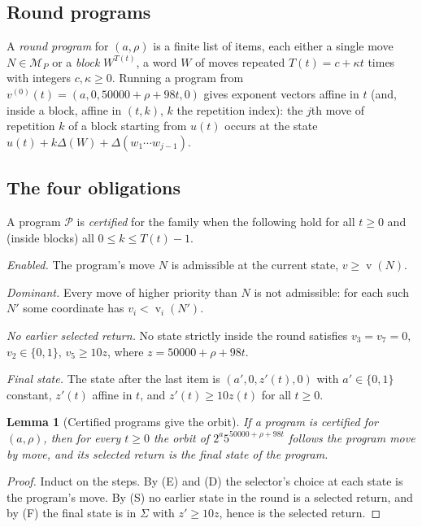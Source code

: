 \documentclass[11pt,a4paper]{article}
\newtheorem{lemma}[theorem]{Lemma}
\theoremstyle{definition}
\newcommand{\Sig}{\Sigma}
\DeclareMathOperator{\vp}{v}
\begin{document}
\subsection{Round programs}
A \emph{round program} for $(a,\rho)$ is a finite list of items, each either a single move $N\in\mathcal{M}_P$ or a \emph{block} $W^{T(t)}$, a word $W$ of moves repeated $T(t)=c+\kappa t$ times with integers $c,\kappa\ge0$. Running a program from $v^{(0)}(t)=(a,0,50000+\rho+98t,0)$ gives exponent vectors affine in $t$ (and, inside a block, affine in $(t,k)$, $k$ the repetition index): the $j$th move of repetition $k$ of a block starting from $u(t)$ occurs at the state $u(t)+k\Delta(W)+\Delta(w_1\cdots w_{j-1})$.

\subsection{The four obligations}
A program $\mathcal{P}$ is \emph{certified} for the family when the following hold for all $t\ge0$ and (inside blocks) all $0\le k\le T(t)-1$.
\begin{description}[leftmargin=1.2em,itemsep=2pt]
\item[(E)] \emph{Enabled.} The program's move $N$ is admissible at the current state, $v\ge \vp(N)$.
\item[(D)] \emph{Dominant.} Every move of higher priority than $N$ is not admissible: for each such $N'$ some coordinate has $v_i<\vp_i(N')$.
\item[(S)] \emph{No earlier selected return.} No state strictly inside the round satisfies $v_3=v_7=0$, $v_2\in\{0,1\}$, $v_5\ge10z$, where $z=50000+\rho+98t$.
\item[(F)] \emph{Final state.} The state after the last item is $(a',0,z'(t),0)$ with $a'\in\{0,1\}$ constant, $z'(t)$ affine in $t$, and $z'(t)\ge10z(t)$ for all $t\ge0$.
\end{description}

\begin{lemma}[Certified programs give the orbit]\label{lem:cert}
If a program is certified for $(a,\rho)$, then for every $t\ge0$ the orbit of $2^a5^{50000+\rho+98t}$ follows the program move by move, and its selected return is the final state of the program.
\end{lemma}
\begin{proof}
Induct on the steps. By (E) and (D) the selector's choice at each state is the program's move. By (S) no earlier state in the round is a selected return, and by (F) the final state is in $\Sig$ with $z'\ge10z$, hence is the selected return.
\end{proof}
\end{document}
